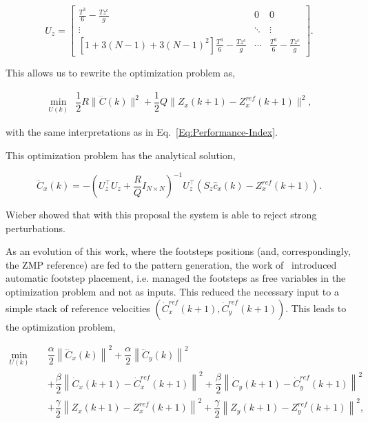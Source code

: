 \begin{equation*}
  U_{z} = \begin{bmatrix}
            \frac{T^3}{6}-\frac{Tz^{c}}{g} & 0 & 0 \\
          \vdots & \ddots & \vdots \\
          [1+3(N-1)+3(N-1)^2]\frac{T^3}{6}-\frac{Tz^{c}}{g} & \cdots & \frac{T^3}{6}-\frac{Tz^{c}}{g}
          \end{bmatrix}.
\end{equation*}

This allows us to rewrite the optimization problem as,

\begin{eqnarray}
\nonumber
\underset{U(k)}{\min} ~~ \dfrac{1}{2} R \| \dddot{{C}}(k) \|^2 + \dfrac{1}{2} Q \|{Z}_x(k+1) - {Z}^{ref}_x(k+1) \|^2,
\end{eqnarray}
 
\noindent with the same interpretations as in Eq.~\ref{Eq:Performance-Index}.

This optimization problem has the analytical solution,

\begin{equation}
\dddot{{C}}_x(k) = -({U}_z^{\top} {U}_z + \dfrac{R}{Q} {I}_{N \times N})^{-1} {U}_z^{\top}({S}_z \hat{c}_x(k) - {Z}_x^{ref}(k+1)).
\end{equation}

Wieber showed that with this proposal the system is able to reject strong perturbations.

As an evolution of this work, where the footsteps positions (and, correspondingly, the ZMP reference) are fed to the pattern generation, the work of~\citep{HerdtAR2010} introduced automatic footstep placement, i.e. managed the footsteps as free variables in the optimization problem and not as inputs. This reduced the necessary input to a simple stack of reference velocities $(\dot{C}_{x}^{ref}(k+1),\dot{C}_{y}^{ref}(k+1))$. This leads to the optimization problem,

\begin{eqnarray}
\nonumber
 \underset{U(k)}{\min} \; && \dfrac{\alpha}{2} \left\| \dddot{C}_x(k) \right\|^2 + \dfrac{\alpha}{2} \left\| \dddot{C}_y(k) \right\|^2 \\
&& + \dfrac{\beta}{2} \left\| \dot{C}_{x}(k+1) - \dot{C}_{x}^{ref}(k+1) \right\|^2 + \dfrac{\beta}{2} \left\| \dot{C}_{y}(k+1) - \dot{C}_{y}^{ref}(k+1) \right\|^2  \nonumber \\
&& + \dfrac{\gamma}{2} \left\| Z_x(k+1) - Z_x^{ref}(k+1) \right\|^2 + \dfrac{\gamma}{2} \left\| Z_y(k+1) - Z_y^{ref}(k+1) \right\|^2,
\label{Eq:MinJerk}
\end{eqnarray}

